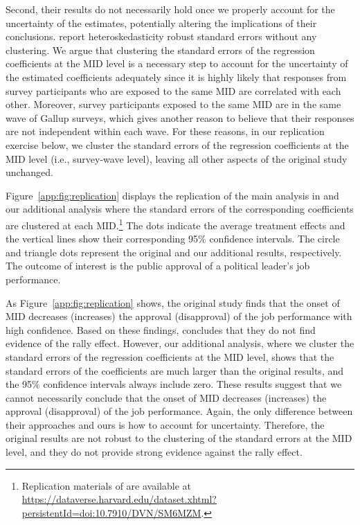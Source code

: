 \documentclass[12pt,letterpaper]{scrartcl}
\let\oldfootnote\footnote
\renewcommand\footnote[1]{\oldfootnote{\hspace{2mm}#1}}
\begin{document}
Second, their results do not necessarily hold once we properly account for the uncertainty of the estimates, potentially altering the implications of their conclusions. \citet{seo2023} report heteroskedasticity robust standard errors without any clustering. We argue that clustering the standard errors of the regression coefficients at the MID level is a necessary step to account for the uncertainty of the estimated coefficients adequately since it is highly likely that responses from survey participants who are exposed to the same MID are correlated with each other. Moreover, survey participants exposed to the same MID are in the same wave of Gallup surveys, which gives another reason to believe that their responses are not independent within each wave. For these reasons, in our replication exercise below, we cluster the standard errors of the regression coefficients at the MID level (i.e., survey-wave level), leaving all other aspects of the original study unchanged.

Figure~\ref{app:fig:replication} displays the replication of the main analysis in \citet{seo2023} and our additional analysis where the standard errors of the corresponding coefficients are clustered at each MID.\footnote{Replication materials of \citet{seo2023} are available at \href{https://dataverse.harvard.edu/dataset.xhtml?persistentId=doi:10.7910/DVN/SM6MZM}{https://dataverse.harvard.edu/dataset.xhtml?persistentId=doi:10.7910/DVN/SM6MZM}.} The dots indicate the average treatment effects and the vertical lines show their corresponding 95\% confidence intervals. The circle and triangle dots represent the original and our additional results, respectively. The outcome of interest is the public approval of a political leader's job performance.

As Figure~\ref{app:fig:replication} shows, the original study finds that the onset of MID decreases (increases) the approval (disapproval) of the job performance with high confidence. Based on these findings, \citet{seo2023} concludes that they do not find evidence of the rally effect. However, our additional analysis, where we cluster the standard errors of the regression coefficients at the MID level, shows that the standard errors of the coefficients are much larger than the original results, and the 95\% confidence intervals always include zero. These results suggest that we cannot necessarily conclude that the onset of MID decreases (increases) the approval (disapproval) of the job performance. Again, the only difference between their approaches and ours is how to account for uncertainty. Therefore, the original results are not robust to the clustering of the standard errors at the MID level, and they do not provide strong evidence against the rally effect.
\end{document}
